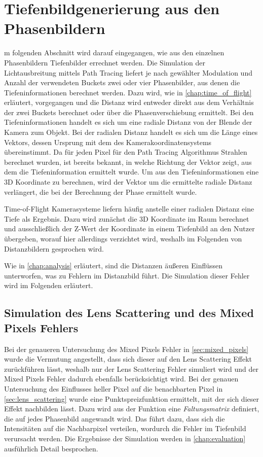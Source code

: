 \documentclass[thesis.tex]{subfiles}
\begin{document}
\section{Tiefenbildgenerierung aus den Phasenbildern}\label{sec:depth_by_phase}
%
m folgenden Abschnitt wird darauf eingegangen, wie aus den einzelnen Phasenbildern Tiefenbilder errechnet werden. Die Simulation der Lichtausbreitung mittels Path Tracing liefert je nach gewählter Modulation und Anzahl der verwendeten Buckets zwei oder vier Phasenbilder, aus denen die Tiefeninformationen berechnet werden. Dazu wird, wie in \autoref{chap:time_of_flight} erläutert, vorgegangen und die Distanz wird entweder direkt aus dem Verhältnis der zwei Buckets berechnet oder über die Phasenverschiebung ermittelt. Bei den Tiefeninformationen handelt es sich um eine radiale Distanz von der Blende der Kamera zum Objekt. Bei der radialen Distanz handelt es sich um die Länge eines Vektors, dessen Ursprung mit dem des Kamerakoordinatensystems übereinstimmt. Da für jeden Pixel für den Path Tracing Algorithmus Strahlen berechnet wurden, ist bereits bekannt, in welche Richtung der Vektor zeigt, aus dem die Tiefeninformation ermittelt wurde. Um aus den Tiefeninformationen eine 3D Koordinate zu berechnen, wird der Vektor um die ermittelte radiale Distanz verlängert, die bei der Berechnung der Phase ermittelt wurde. 

Time-of-Flight Kamerasysteme liefern häufig anstelle einer radialen Distanz eine Tiefe als Ergebnis. Dazu wird zunächst die 3D Koordinate im Raum berechnet und ausschließlich der Z-Wert der Koordinate in einem Tiefenbild an den Nutzer übergeben, worauf hier allerdings verzichtet wird, weshalb im Folgenden von Distanzbildern gesprochen wird.

Wie in \autoref{chap:analysis} erläutert, sind die Distanzen äußeren Einflüssen unterworfen, was zu Fehlern im Distanzbild führt. Die Simulation dieser Fehler wird im Folgenden erläutert. 
%
\subsection{Simulation des Lens Scattering und des Mixed Pixels Fehlers}
%
Bei der genaueren Untersuchung des Mixed Pixels Fehler in \autoref{sec:mixed_pixels} wurde die Vermutung angestellt, dass sich dieser auf den Lens Scattering Effekt zurückführen lässt, weshalb nur der Lens Scattering Fehler simuliert wird und der Mixed Pixels Fehler dadurch ebenfalls berücksichtigt wird. Bei der genauen Untersuchung des Einflusses heller Pixel auf die benachbarten Pixel in \autoref{sec:lens_scattering} wurde eine Punktspreizfunktion ermittelt, mit der sich dieser Effekt nachbilden lässt. Dazu wird aus der Funktion eine \emph{Faltungsmatrix} definiert, die auf jedes Phasenbild angewandt wird. Das führt dazu, dass sich die Intensitäten auf die Nachbarpixel verteilen, wordurch die Fehler im Tiefenbild verursacht werden. Die Ergebnisse der Simulation werden in \autoref{chap:evaluation} ausführlich Detail besprochen.
%
\end{document}
